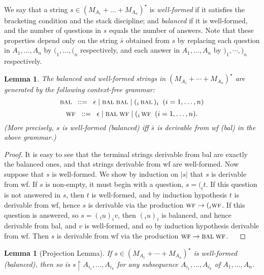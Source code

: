 \documentclass[11pt]{article}
\newtheorem{lemma}[theorem]{Lemma}
\newcommand{\Rest}{{\upharpoonright}}
\begin{document}
We say that a string $s \in (M_{A_{1}} + \ldots + M_{A_{n}})^{\star}$ is
{\em well-formed}
if it satisfies the bracketing condition and the stack discipline; and
{\em balanced} if it is well-formed, and the number of questions in $s$
equals the number of answers.
Note that these properties depend only on the string $\bar{s}$ obtained from $s$
by replacing each question in $A_{1}, \ldots , A_{n}$ by
$(_{1}, \ldots , (_{n}$ respectively, and each answer in $A_{1}, \ldots ,
A_{n}$ by $)_{1}, \cdots , )_{n}$ respectively.

\begin{lemma}
The balanced and well-formed strings in
$(M_{A_{1}} + \cdots + M_{A_{n}})^{\star}$
are generated by the following context-free grammar:
\[ \mbox{\sc bal} \;\;  ::=  \;\;  \epsilon \; | \; \mbox{\sc bal} \; \mbox{\sc bal}
\; | \; (_{i} \,  \mbox{\sc bal}\,  )_{i} \;\; (i = 1, \ldots , n) \]
\[ \mbox{\sc wf} \;\; ::= \;\; \epsilon \; | \; \mbox{\sc bal} \; \mbox{\sc wf} \; | \;
(_{i} \, \mbox{\sc wf} \;\; (i=1, \ldots , n) . \]
(More precisely, $s$ is well-formed (balanced) iff $\bar{s}$ is derivable from
{\sc wf} ({\sc bal}) in the above grammar.)
\end{lemma}

\begin{proof} It is easy to see that the terminal strings derivable
from {\sc bal} are exactly the balanced ones, and that strings
derivable from {\sc wf} are well-formed. Now suppose that $s$ is
well-formed. We show by induction on $|s|$ that $s$ is derivable
from {\sc wf}. If $s$ is non-empty, it must begin with a question,
$s = (_{i}t$. If this question is not answered in $s$, then $t$ is
well-formed, and by induction hypothesis $t$ is derivable from
{\sc wf}, hence $s$ is derivable via the production $\mbox{\sc wf}
\rightarrow (_{i} \mbox{\sc wf}$. If this question is answered, so
$s = (_{i} u )_{i} v$, then $(_{i} u )_{i}$ is balanced, and hence
derivable from {\sc bal}, and $v$ is well-formed, and so by
induction hypothesis derivable from {\sc wf}. Then $s$ is
derivable from {\sc wf} via the production $\mbox{\sc wf}
\rightarrow\mbox{\sc bal} \; \mbox{\sc wf}$. $\;\;\; $
\end{proof}

\begin{lemma}[Projection Lemma]
If $s \in (M_{A_{1}} + \cdots + M_{A_{n}})^{\star}$ is well-formed (balanced),
then
so is $s \Rest A_{i_1}, \ldots , A_{i_k}$ for any subsequence
$A_{i_1}, \ldots , A_{i_k}$ of $A_{1}, \ldots , A_{n}$.
\end{lemma}
\end{document}
